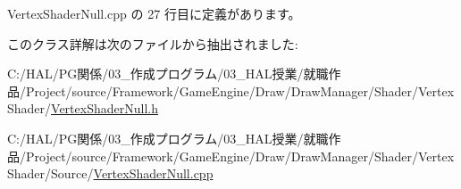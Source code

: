  Vertex\+Shader\+Null.\+cpp の 27 行目に定義があります。



このクラス詳解は次のファイルから抽出されました\+:\begin{DoxyCompactItemize}
\item 
C\+:/\+H\+A\+L/\+P\+G関係/03\+\_\+作成プログラム/03\+\_\+\+H\+A\+L授業/就職作品/\+Project/source/\+Framework/\+Game\+Engine/\+Draw/\+Draw\+Manager/\+Shader/\+Vertex\+Shader/\mbox{\hyperlink{_vertex_shader_null_8h}{Vertex\+Shader\+Null.\+h}}\item 
C\+:/\+H\+A\+L/\+P\+G関係/03\+\_\+作成プログラム/03\+\_\+\+H\+A\+L授業/就職作品/\+Project/source/\+Framework/\+Game\+Engine/\+Draw/\+Draw\+Manager/\+Shader/\+Vertex\+Shader/\+Source/\mbox{\hyperlink{_vertex_shader_null_8cpp}{Vertex\+Shader\+Null.\+cpp}}\end{DoxyCompactItemize}
